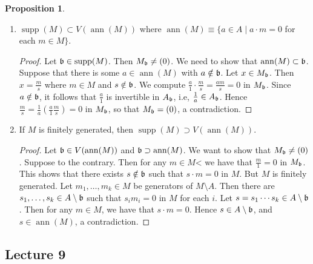 \documentclass[10pt,letterpaper,cm]{nupset}
\theoremstyle{definition}
\theoremstyle{theorem}
\newtheorem{prop}[definition]{Proposition}
\theoremstyle{remark}
\newcommand{\1}{\mathbf{1}}
\newcommand{\0}{\vec 0}
\DeclareMathOperator{\ann}{ann}
\DeclareMathOperator{\supp}{supp}
\begin{document}
\begin{prop} $ $
\begin{enumerate}
\item $\supp(M) \subset V(\ann(M))$ where $\ann(M) \equiv \{a\in A \mid a\cdot m = 0$ for each $m\in M\}$. 
\begin{proof}
Let $\frak{b} \in \supp(M)$. Then $M_{\frak{b}} \ne (0)$. We need to show that $\ann(M) \subset \frak{b}$.  Suppose that there is some $a\in \ann(M)$ with $a\notin \frak{b}$. Let $x\in M_{\frak{b}}$. Then $x= \frac{m}{s}$ where $m\in M$ and $s\notin \frak{b}$. We compute $\frac{a}{1} \cdot \frac{m}{s} = \frac{am}{s} = 0$ in $M_{\frak{b}}$. Since $a\notin \frak{b}$, it follows that $\frac{a}{1}$ is invertible in $A_{\frak{b}}$, i.e, $\frac{1}{a} \in A_{\frak{b}}$. Hence $\frac{m}{s} = \frac{1}{a}\left(\frac{a}{1}\frac{m}{s}\right) = 0$ in $M_{\frak{b}}$, so that $M_{\frak{b}} = (0)$, a contradiction.  
\end{proof}
\item If $M$ is finitely generated, then  $\supp(M) \supset V(\ann(M))$.
\begin{proof}
Let $\frak{b} \in V(\ann(M))$ and $\frak{b} \supset \ann(M)$. We want to show that $M_{\frak{b}} \ne (0)$. Suppose to the contrary. Then for any $m\in M$< we have that $\frac{m}{1} =0$ in $M_{\frak{b}}$. This shows that there exists $s\notin \frak{b}$ such that $s\cdot m = 0$ in $M$. But $M$ is finitely generated. Let $m_1, \ldots, m_k \in M$ be generators of $M \setminus A$. Then there are $s_1, \ldots, s_k \in A \setminus \frak{b}$ such that $s_im_i =0$ in $M$ for each $i$. Let $s = s_1 \cdots s_k \in A\setminus \frak{b}$. Then for any $m\in M$, we have that $s\cdot m = 0$. Hence $s\in A \setminus \frak{b}$, and $s\in \ann(M)$, a contradiction. 
\end{proof}
\end{enumerate}
\end{prop}

\subsection{Lecture 9}
\end{document}
